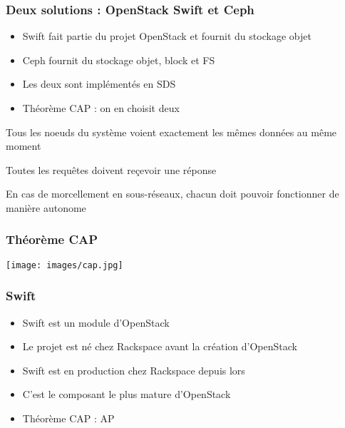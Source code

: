   \begin{frame}
    \frametitle{Deux solutions : OpenStack Swift et Ceph}
    \begin{itemize}
      \item Swift fait partie du projet OpenStack et fournit du stockage objet
      \item Ceph fournit du stockage objet, block et FS
      \item Les deux sont implémentés en SDS
      \item Théorème CAP : on en choisit deux
    \end{itemize}
    \begin{description}
        \item[Consistancy] Tous les noeuds du système voient exactement les mêmes données au même moment
        \item[Availability] Toutes les requêtes doivent reçevoir une réponse
        \item[Partition Tolerance] En cas de morcellement en sous-réseaux, chacun doit pouvoir fonctionner de manière autonome
    \end{description}
  \end{frame}

  \begin{frame}
  \frametitle{Théorème CAP}
  \texttt{[image: images/cap.jpg]}
  \end{frame}

  \begin{frame}
  \frametitle{Swift}
    \begin{itemize}
      \item Swift est un module d'OpenStack
      \item Le projet est né chez Rackspace avant la création d'OpenStack
      \item Swift est en production chez Rackspace depuis lors
      \item C'est le composant le plus mature d'OpenStack
      \item Théorème CAP : AP
    \end{itemize}
  \end{frame}

